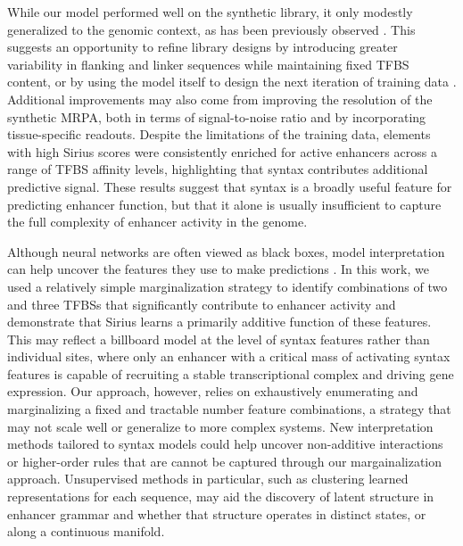 While our model performed well on the synthetic library, it only modestly generalized to the genomic context, as has been previously observed \cite{King2020-hk,Fromel2024-ux}. This suggests an opportunity to refine library designs by introducing greater variability in flanking and linker sequences while maintaining fixed TFBS content, or by using the model itself to design the next iteration of training data \cite{Friedman2023-yh}. Additional improvements may also come from improving the resolution of the synthetic MRPA, both in terms of signal-to-noise ratio and by incorporating tissue-specific readouts. Despite the limitations of the training data, elements with high Sirius scores were consistently enriched for active enhancers across a range of TFBS affinity levels, highlighting that syntax contributes additional predictive signal. These results suggest that syntax is a broadly useful feature for predicting enhancer function, but that it alone is usually insufficient to capture the full complexity of enhancer activity in the genome.

Although neural networks are often viewed as black boxes, model interpretation can help uncover the features they use to make predictions \cite{Novakovsky2022-ft}. In this work, we used a relatively simple marginalization strategy to identify combinations of two and three TFBSs that significantly contribute to enhancer activity and demonstrate that Sirius learns a primarily additive function of these features. This may reflect a billboard model at the level of syntax features rather than individual sites, where only an enhancer with a critical mass of activating syntax features is capable of recruiting a stable transcriptional complex and driving gene expression. Our approach, however, relies on exhaustively enumerating and marginalizing a fixed and tractable number feature combinations, a strategy that may not scale well or generalize to more complex systems. New interpretation methods tailored to syntax models could help uncover non-additive interactions or higher-order rules that are cannot be captured through our margainalization approach. Unsupervised methods in particular, such as clustering learned representations for each sequence, may aid the discovery of latent structure in enhancer grammar and whether that structure operates in distinct states, or along a continuous manifold.

